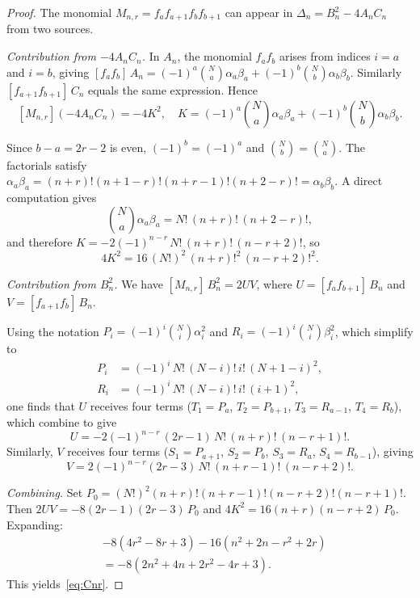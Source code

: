 \documentclass[10pt]{amsart}
\theoremstyle{definition}
\theoremstyle{remark}
\begin{document}
\begin{proof}
The monomial $M_{n,r}=f_af_{a+1}f_bf_{b+1}$ can appear in
$\Delta_n=B_n^2-4A_nC_n$ from two sources.

\medskip\noindent\emph{Contribution from $-4A_nC_n$.}
In $A_n$, the monomial $f_a f_b$ arises from indices $i=a$ and $i=b$, giving
$[f_af_b]\,A_n = (-1)^a\binom{N}{a}\alpha_a\beta_a
+ (-1)^b\binom{N}{b}\alpha_b\beta_b$.
Similarly $[f_{a+1}f_{b+1}]\,C_n$ equals the same expression.  Hence
\begin{equation}\label{eq:4AC}
[M_{n,r}](-4A_nC_n) = -4K^2, \quad
K = (-1)^a\binom{N}{a}\alpha_a\beta_a
+ (-1)^b\binom{N}{b}\alpha_b\beta_b.
\end{equation}

Since $b-a=2r-2$ is even, $(-1)^b=(-1)^a$ and $\binom{N}{b}=\binom{N}{a}$.
The factorials satisfy
$\alpha_a\beta_a = (n+r)!(n+1-r)!(n+r-1)!(n+2-r)! = \alpha_b\beta_b$.
A direct computation gives
\begin{equation}\label{eq:K-term}
\binom{N}{a}\alpha_a\beta_a = N!\,(n+r)!\,(n+2-r)!,
\end{equation}
and therefore $K = -2(-1)^{n-r}\,N!\,(n+r)!\,(n-r+2)!$,
so
\begin{equation}\label{eq:4K2}
4K^2 = 16\,(N!)^2\,(n+r)!^2\,(n-r+2)!^2.
\end{equation}

\medskip\noindent\emph{Contribution from $B_n^2$.}
We have $[M_{n,r}]\,B_n^2 = 2UV$, where
$U=[f_af_{b+1}]\,B_n$ and $V=[f_{a+1}f_b]\,B_n$.

Using the notation $P_i = (-1)^i\binom{N}{i}\alpha_i^2$
and $R_i = (-1)^i\binom{N}{i}\beta_i^2$, which simplify to
\begin{align*}
P_i &= (-1)^i\,N!\,(N-i)!\,i!\,(N+1-i)^2,\\
R_i &= (-1)^i\,N!\,(N-i)!\,i!\,(i+1)^2,
\end{align*}
one finds that $U$ receives four terms ($T_1=P_a$, $T_2=P_{b+1}$,
$T_3=R_{a-1}$, $T_4=R_b$), which combine to give
\begin{equation}\label{eq:U}
U = -2(-1)^{n-r}\,(2r-1)\,N!\,(n+r)!\,(n-r+1)!.
\end{equation}
Similarly, $V$ receives four terms ($S_1=P_{a+1}$, $S_2=P_b$,
$S_3=R_a$, $S_4=R_{b-1}$), giving
\begin{equation}\label{eq:V}
V = 2(-1)^{n-r}(2r-3)\,N!\,(n+r-1)!\,(n-r+2)!.
\end{equation}

\medskip\noindent\emph{Combining.}
Set $P_0 = (N!)^2(n+r)!(n+r-1)!(n-r+2)!(n-r+1)!$.  Then
$2UV = -8(2r-1)(2r-3)\,P_0$ and $4K^2 = 16(n+r)(n-r+2)\,P_0$.
Expanding:
\begin{align*}
&-8(4r^2-8r+3) - 16(n^2+2n-r^2+2r) \\
&= -8(2n^2+4n+2r^2-4r+3).
\end{align*}
This yields~\eqref{eq:Cnr}.
\end{proof}
\end{document}
